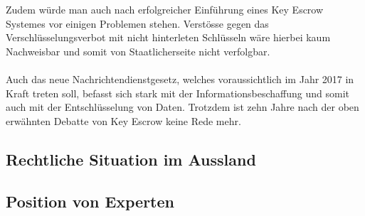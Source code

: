 Zudem würde man auch nach erfolgreicher Einführung eines Key Escrow Systemes vor einigen Problemen stehen. Verstösse gegen das Verschlüsselungsverbot mit nicht hinterleten Schlüsseln wäre hierbei kaum Nachweisbar und somit von Staatlicherseite nicht verfolgbar. \cite{null} \\%
\\
Auch das neue Nachrichtendienstgesetz, welches voraussichtlich im Jahr 2017 in Kraft treten soll, befasst sich stark mit der Informationsbeschaffung und somit auch mit der Entschlüsselung von Daten. Trotzdem ist  zehn Jahre nach der oben erwähnten Debatte von Key Escrow keine Rede mehr. \cite{null} \\
		
	\subsection{Rechtliche Situation im Aussland}
	\subsection{Position von Experten}
